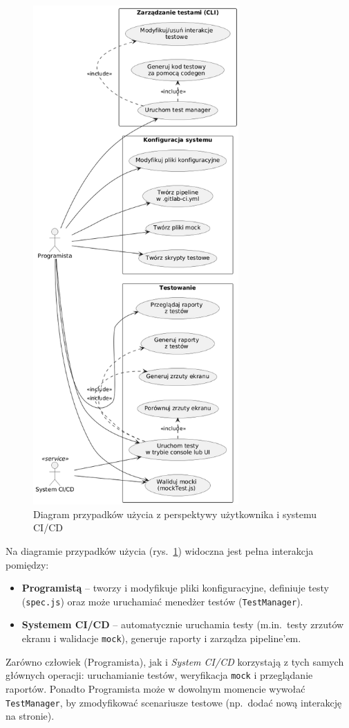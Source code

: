 \documentclass[12pt]{report}
\begin{document}
\begin{figure}[H]
\centering
\includegraphics[width=0.7\textwidth]{use-uml.png}
\caption{Diagram przypadków użycia z perspektywy użytkownika i systemu CI/CD}
\label{fig:diag-use-case}
\end{figure}

Na diagramie przypadków użycia (rys.~\ref{fig:diag-use-case}) widoczna jest pełna interakcja pomiędzy:
\begin{itemize}
   \item \textbf{Programistą} -- tworzy i modyfikuje pliki konfiguracyjne, definiuje testy (\texttt{spec.js}) oraz może uruchamiać menedżer testów (\texttt{TestManager}).
   \item \textbf{Systemem CI/CD} -- automatycznie uruchamia testy (m.in.~testy zrzutów ekranu i walidacje \texttt{mock}), generuje raporty i zarządza pipeline’em.
\end{itemize}
Zarówno człowiek (Programista), jak i \emph{System CI/CD} korzystają z tych samych głównych operacji: uruchamianie testów, weryfikacja \texttt{mock} i przeglądanie raportów. Ponadto Programista może w dowolnym momencie wywołać \texttt{TestManager}, by zmodyfikować scenariusze testowe (np.~dodać nową interakcję na stronie).
\end{document}
